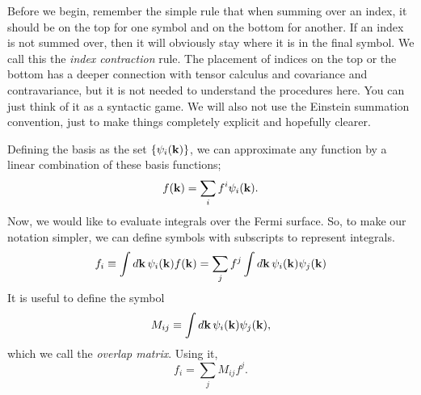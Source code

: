 \documentclass[12pt]{article}
\begin{document}
Before we begin, remember the simple rule that when summing over an index, it should be on the top
for one symbol and on the bottom for another. If an index is not summed over, then it will obviously
stay where it is in the final symbol. We call this the \emph{index contraction} rule. The placement
of indices on the top or the bottom has a deeper connection with tensor calculus and covariance and
contravariance, but it is not needed to understand the procedures here. You can just think of it as
a syntactic game. We will also not use the Einstein summation convention, just to make things
completely explicit and hopefully clearer.

Defining the basis as the set $\{\psi_i(\vb{k})\}$, we can approximate any function by a linear
combination of these basis functions;
\begin{equation}
    f(\vb{k}) = \sum_i f^{i}\psi_i(\vb{k}). \label{eq:vector}
\end{equation}
Now, we would like to evaluate integrals over the Fermi surface. So, to make our notation simpler,
we can define symbols with subscripts to represent integrals.
\begin{equation}
    f_i \equiv \int\dd{\vb{k}} \psi_i(\vb{k}) f(\vb{k})
    = \sum_j f^j \int\dd{\vb{k}} \psi_i(\vb{k}) \psi_j(\vb{k})
    \label{eq:integral_vector}
\end{equation}
It is useful to define the symbol
\begin{equation}
    M_{ij} \equiv \int \dd{\vb{k}} \psi_i(\vb{k}) \psi_j(\vb{k}),
    \label{eq:overlap}
\end{equation}
which we call the \emph{overlap matrix}. Using it,
\begin{equation}
    f_i = \sum_j M_{ij} f^j.
    \label{eq:lowering_vector}
\end{equation}
\end{document}
